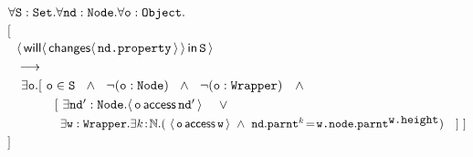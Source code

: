 \noindent
$\forall {\mbox{\tt{S}}}:{\mbox{\tt{Set}}}.\forall {\mbox{\tt{nd}}}:{\mbox{\tt{Node}}}.\forall {\mbox{\tt{o}}}:{\mbox{\tt{Object}}}.$\\
$[$ \\
$\strut\  \ {\langle\, {\mathsf{will}}\langle \,{\mathsf{changes}}\langle\,{\mbox{\tt{nd.property}}}\,\rangle\,\rangle\, \mathsf{in}\, {\mbox{\tt{S}}}\, \rangle}$ \\
$\strut  \ \ \longrightarrow$\\
$\strut \ \ \ \exists {\mbox{\tt{o}}}.[\ {\mbox{\tt{o}}}\in{\mbox{\tt{S}}}\ \ \wedge\ \ \neg({\mbox{\tt{o}}}:{\mbox{\tt{Node}}})\ \ \wedge\  \ \neg({\mbox{\tt{o}}}:{\mbox{\tt{Wrapper}}})\ \ \ \wedge \  $\\
$ \strut\ \ \  \ \ \ \ \ \ \ \ [\ \exists {\mbox{\tt{nd}}}':{\mbox{\tt{Node}}}. \langle\, {\mbox{\tt{o}}}\, \mathsf{access}\, {\mbox{\tt{nd}}}'\, \rangle\  \ \ \  \vee$\\
$ \strut\ \  \ \  \ \  \ \ \ \ \ \ \ \exists {\mbox{\tt{w}}}:{\mbox{\tt{Wrapper}}}.\exists k\!:\!\mathbb{N}.
  (\ \langle\, {\mbox{\tt{o}}}\, \mathsf{access}\, {\mbox{\tt{w}}}\, \rangle  \ \wedge\ {\mbox{\tt{nd}}}.{\mbox{\tt{parnt}}}^k\!=\!{\mbox{\tt{w.node}}}.{\mbox{\tt{parnt}}}^{{\mbox{\tt{w.height}}}}) \ \ \ ]\ ]$\\
$ ]$

\vspace{.1cm}


